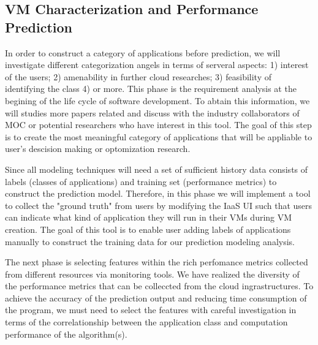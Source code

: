 \subsection{VM Characterization and Performance Prediction}

In order to construct a category of applications before prediction, we will investigate different categorization angels in terms of serveral aspects: 1) interest of the users; 2) amenability in further cloud researches; 3) feasibility of identifying the class 4) or more. This phase is the requirement analysis at the begining of the life cycle of software development. To abtain this information, we will studies more papers related and discuss with the industry collaborators of MOC or potential researchers who have interest in this tool. The goal of this step is to create the most meaningful category of applications that will be appliable to user's descision making or optomization research.

Since all modeling techniques will need a set of sufficient history data consists of labels (classes of applications) and training set (performance metrics) to construct the prediction model. Therefore, in this phase we will implement a tool to collect the "ground truth" from users by modifying the IaaS UI such that users can indicate what kind of application they will run in their VMs during VM creation. The goal of this tool is to enable user adding labels of applications manually to construct the training data for our prediction modeling analysis.

The next phase is selecting features within the rich perfomance metrics collected from different resources via monitoring tools. We have realized the diversity of the performance metrics that can be colleccted from the cloud ingrastructures. To achieve the accuracy of the prediction output and reducing time consumption of the program, we must need to select the features with careful investigation in terms of the correlationship between the application class and computation performance of the algorithm(s).